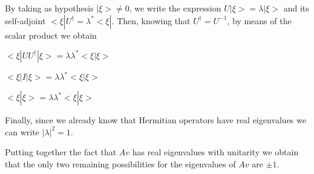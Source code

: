 \documentclass[12pt]{report}
\begin{document}
\begin{minipage}{1\textwidth}
		
		By taking as hypothesis $|\xi> \neq 0$, we write the expression $U |\xi> = \lambda |\xi>$ and its self-adjoint $<\xi| U^{\dagger} = \lambda^* <\xi|$. Then, knowing that $U^{\dagger}=U^{-1}$, by means of the scalar product we obtain \newline
		
		\begin{center}
			$<\xi|U U^{\dagger}|\xi> = \lambda \lambda^* <\xi |\xi>$\newline
			
			$<\xi|I|\xi> = \lambda \lambda^* <\xi |\xi>$\newline
			
			$<\xi|\xi> = \lambda \lambda^* <\xi |\xi>$\newline
		\end{center}
		
		Finally, since we already know that Hermitian operators have real eigenvalues we can write $|\lambda|^2 = 1$.\newline
		
		Putting together the fact that $Av$ has real eigenvalues with unitarity we obtain that the only two remaining possibilities for the eigenvalues of $Av$ are $\pm 1$. \newline
		
		
		
	\end{minipage}
	
\end{document}
